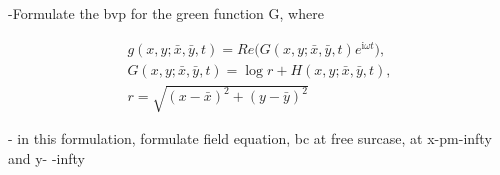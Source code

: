-Formulate the bvp for the green function G, where

\begin{align}
	g(x,y; \bar{x}, \bar{y}, t) = Re\big( G(x,y; \bar{x}, \bar{y}, t) e^{\mathrm{i} \omega t} \big),\\
	G(x,y; \bar{x}, \bar{y}, t) =\log r + H(x,y; \bar{x}, \bar{y}, t), \\ 
	r = \sqrt{(x- \bar{x})^2 + (y- \bar{y})^2}
\end{align}

- in this formulation, formulate field equation, bc at free surcase, at x-pm-infty and y- -infty



